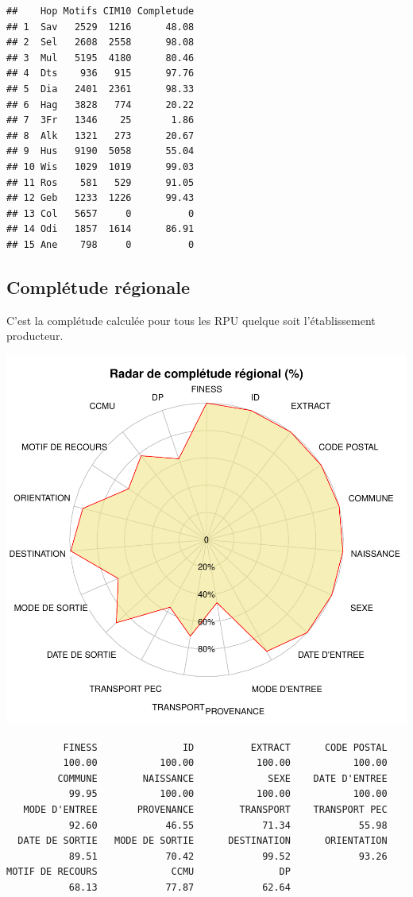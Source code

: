 \documentclass[]{article}
\begin{document}
\begin{verbatim}
##    Hop Motifs CIM10 Completude
## 1  Sav   2529  1216      48.08
## 2  Sel   2608  2558      98.08
## 3  Mul   5195  4180      80.46
## 4  Dts    936   915      97.76
## 5  Dia   2401  2361      98.33
## 6  Hag   3828   774      20.22
## 7  3Fr   1346    25       1.86
## 8  Alk   1321   273      20.67
## 9  Hus   9190  5058      55.04
## 10 Wis   1029  1019      99.03
## 11 Ros    581   529      91.05
## 12 Geb   1233  1226      99.43
## 13 Col   5657     0          0
## 14 Odi   1857  1614      86.91
## 15 Ane    798     0          0
\end{verbatim}

\subsection{Complétude régionale}\label{completude-regionale}

C'est la complétude calculée pour tous les RPU quelque soit
l'établissement producteur.

\includegraphics{completude_files/figure-latex/comp_regionale-1.pdf}

\begin{verbatim}
          FINESS               ID          EXTRACT      CODE POSTAL 
          100.00           100.00           100.00           100.00 
         COMMUNE        NAISSANCE             SEXE    DATE D'ENTREE 
           99.95           100.00           100.00           100.00 
   MODE D'ENTREE       PROVENANCE        TRANSPORT    TRANSPORT PEC 
           92.60            46.55            71.34            55.98 
  DATE DE SORTIE   MODE DE SORTIE      DESTINATION      ORIENTATION 
           89.51            70.42            99.52            93.26 
MOTIF DE RECOURS             CCMU               DP 
           68.13            77.87            62.64 
\end{verbatim}
\end{document}
